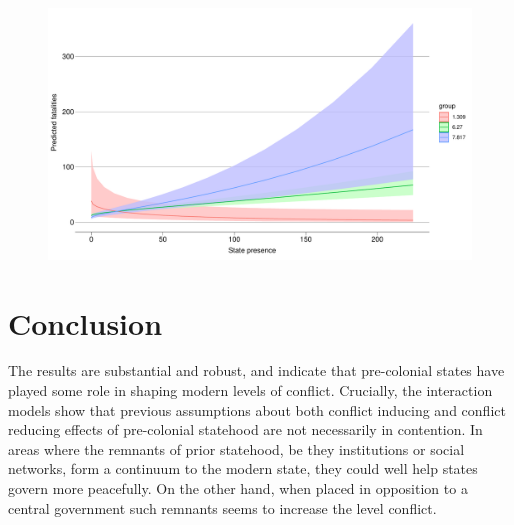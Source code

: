 \documentclass[12pt]{article}
\begin{document}

\begin{figure}[htpb]
	\centering
	\includegraphics[width=\linewidth]{"../R/Output/deathsIntPlot.pdf"}
	\caption{}
	\label{deaths_int}
\end{figure}



\section{Conclusion}

The results are substantial  and robust, and indicate that pre-colonial states
have played some role in shaping modern levels of conflict. Crucially, the
interaction models show that previous assumptions about both conflict inducing
and conflict reducing effects of pre-colonial statehood are not necessarily in
contention. In areas where the remnants of prior statehood, be they institutions
or social networks, form a continuum to the modern state, they could well help
states govern more peacefully. On the other hand, when placed in opposition to a
central government such remnants seems to increase the level conflict.


\pagebreak



\end{document}
